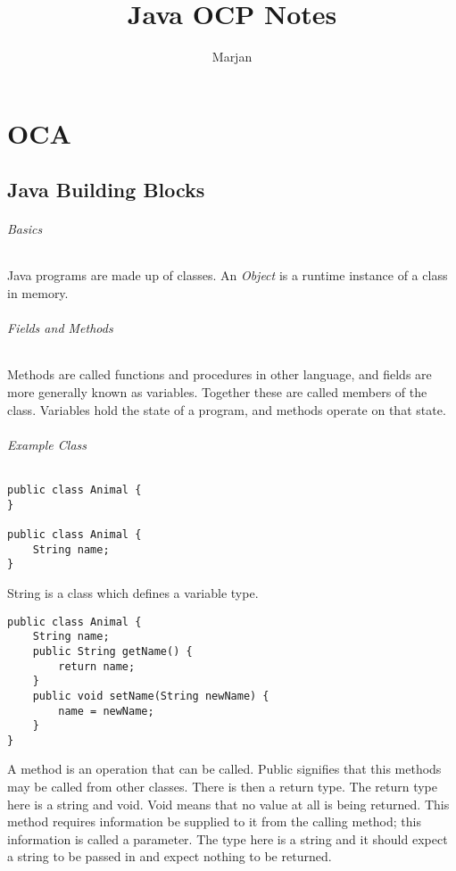 \documentclass[a4paper]{report}   %
\begin{document}
\title{Java OCP Notes}
\author{Marjan}

\maketitle

\tableofcontents
\newpage

\part*{OCA}

\chapter{Java Building Blocks}

\paragraph{Basics}

Java programs are made up of classes. An \textit{Object} is a runtime instance of a class in memory. 

\paragraph{Fields and Methods}

Methods are called functions and procedures in other language, and fields are more generally known as variables. Together these are called members of the class. Variables hold the state of a program, and methods operate on that state.

\lstset{language=Java}
\paragraph{Example Class}

\begin{lstlisting}
public class Animal {
}

public class Animal {
	String name;
}
\end{lstlisting}

String is a class which defines a variable type.

\begin{lstlisting}
public class Animal {
	String name;
	public String getName() {
		return name;
	}
	public void setName(String newName) {
		name = newName;
	}
}
\end{lstlisting}

A method is an operation that can be called. Public signifies that this methods may be called from other classes. There is then a return type. The return type here is a string and void. Void means that no value at all is being returned. This method requires information be supplied to it from the calling method; this information is called a parameter. The type here is a string and it should expect a string to be passed in and expect nothing to be returned.\\
\end{document}
